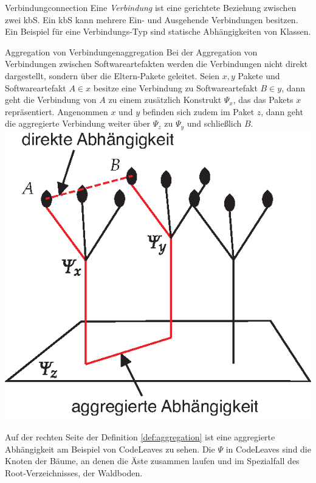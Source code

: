 \begin{defboxfullwidth}{Verbindung}{connection}
Eine \textit{Verbindung} ist eine gerichtete Beziehung zwischen zwei kbS. Ein kbS kann mehrere Ein- und Ausgehende Verbindungen besitzen. Ein Beispiel für eine Verbindungs-Typ sind statische Abhängigkeiten von Klassen.
\end{defboxfullwidth}

\begin{splitbox}{Aggregation von Verbindungen}{aggregation}
Bei der Aggregation von Verbindungen zwischen Softwareartefakten werden die Verbindungen nicht direkt dargestellt, sondern über die Eltern-Pakete geleitet. Seien $x, y$ Pakete und Softwareartefakt $A \in x$ besitze eine Verbindung zu Softwareartefakt $B \in y$, dann geht die Verbindung von $A$ zu einem zusätzlich Konstrukt $\Psi_x$, das das Pakets $x$ repräsentiert. Angenommen $x$ und $y$ befinden sich zudem im Paket $z$, dann geht die aggregierte Verbindung weiter über $\Psi_z$ zu $\Psi_y$ und schließlich $B$.
\tcblower
\includegraphics[width=\linewidth]{figures/aggregation}
\end{splitbox}

Auf der rechten Seite der Definition \ref{def:aggregation} ist eine aggregierte Abhängigkeit am Beispiel von CodeLeaves zu sehen. Die $\Psi$ in CodeLeaves sind die Knoten der Bäume, an denen die Äste zusammen laufen und im Spezialfall des Root-Verzeichnisses, der Waldboden.

